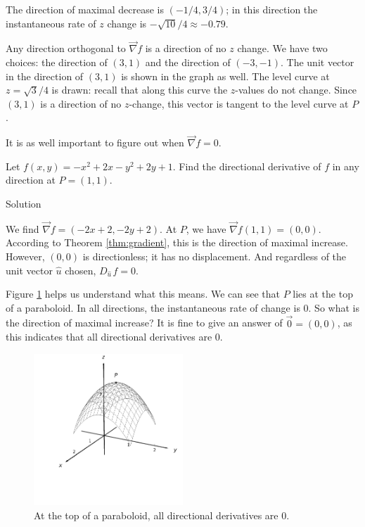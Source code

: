 \begin{example}
The direction of maximal decrease is $\left( -1/4,3/4\right)$; in this direction the instantaneous rate of $z$ change is $-\sqrt{10}/4 \approx -0.79$.

Any direction orthogonal to $\vec{\nabla} f$ is a direction of no $z$ change. We have two choices: the direction of $\left( 3,1\right)$ and the direction of $\left( -3,-1\right)$. The unit vector in the direction of $\left( 3,1\right)$ is shown in the graph as well. The level curve at $z=\sqrt{3}/4$ is drawn: recall that along this curve the $z$-values do not change. Since $\left( 3,1\right)$ is a direction of no $z$-change, this vector is tangent to the level curve at $P$.
\end{example}

It is as well important to figure out when $\vec{\nabla} f=0$. 

\begin{example}\label{ex_direct9}
Let $f(x,y) = -x^2+2x-y^2+2y+1$. Find the directional derivative of $f$ in any direction at $P=(1,1)$.

Solution 

We find $\vec{\nabla} f = \left( -2x+2, -2y+2\right)$. At $P$, we have $\vec{\nabla} f(1,1) = \left(0,0\right)$. 
According to Theorem \ref{thm:gradient}, this is the direction of maximal increase. However, $\left( 0,0\right)$ is directionless; it has no displacement. And regardless of the unit vector $\hat u$ chosen, $D_{\hat u\,}f = 0$.

Figure \ref{fig_multi_var_15} helps us understand what this means. We can see that $P$ lies at the top of a paraboloid. In all directions, the instantaneous rate of change is 0. So what is the direction of maximal increase? It is fine to give an answer of $\vec 0 = \left( 0,0\right)$, as this indicates that all directional derivatives are 0.

\begin{figure}[H]
	\begin{center}
			\includegraphics[width=0.5\textwidth]{fig_multi_var_15}
	\caption{At the top of a paraboloid, all directional derivatives are 0.}
	\label{fig_multi_var_15}
	\end{center}
\end{figure}


\end{example}

